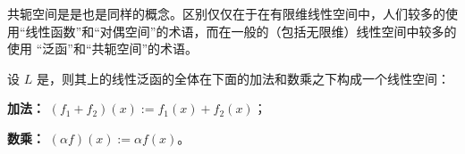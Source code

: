 
共轭空间是是也是同样的概念。区别仅仅在于在有限维线性空间中，人们较多的使用“线性函数”和“对偶空间”的术语，而在一般的（包括无限维）线性空间中较多的使用 “泛函”和“共轭空间”的术语。

\begin{lemma}
设 $L$ 是，则其上的线性泛函的全体在下面的加法和数乘之下构成一个线性空间：

\textbf{加法：} $(f_1+f_2)(x):=f_1(x)+f_2(x)$；

\textbf{数乘：} $(\alpha f)(x):=\alpha f(x)$。
\end{lemma}


\begin{definition}{}

\end{definition}
